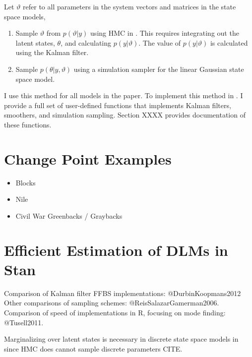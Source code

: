Let $\vartheta$ refer to all parameters in the system vectors and matrices in the state space models,
\begin{enumerate}
\item Sample $\vartheta$ from $p(\vartheta | y)$ using HMC in \Stan{}.
  This requires integrating out the latent states, $\theta$, and calculating $p(y | \vartheta)$.
  The value of $p(y | \vartheta)$ is calculated using the Kalman filter.
\item Sample $p(\theta | y, \vartheta)$ using a simulation sampler for the linear Gaussian state space model.
\end{enumerate}
I use this method for all models in the paper. 
To implement this method in \Stan{}.
I provide a full set of user-defined \Stan{} functions that implements Kalman filters, smoothers, and simulation sampling.
Section XXXX provides documentation of these functions.



\section{Change Point Examples}
\label{dlm:sec:examples}


\begin{itemize}
\item Blocks
\item Nile
\item Civil War Greenbacks / Graybacks
\end{itemize}






\section{Efficient Estimation of DLMs in Stan}
\label{dlm:sec:effic-estim-dlms}

Comparison of Kalman filter FFBS implementations: @DurbinKoopmans2012
Other comparisons of sampling schemes: @ReisSalazarGamerman2006.
Comparison of speed of implementations in R, focusing on mode finding: @Tusell2011.


Marginalizing over latent states is necessary in discrete state space models in \Stan{} since HMC does cannot sample discrete parameters CITE.


